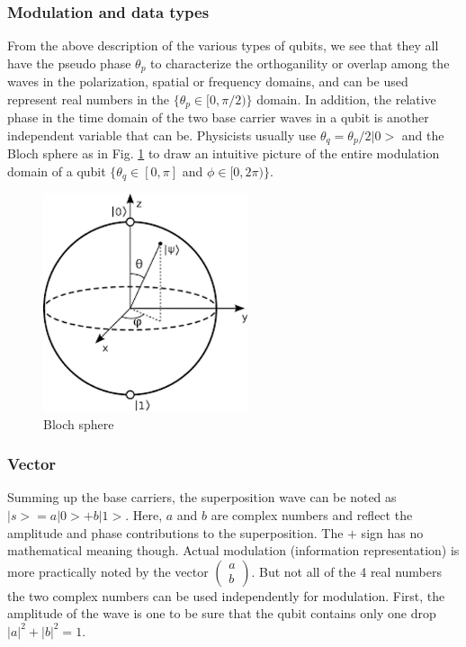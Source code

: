 \documentclass{book}
\begin{document}
\subsubsection{Modulation and data types}
From the above description of the various types of qubits, we see that they all have the pseudo phase $\theta_p$ to characterize the 
orthoganility or overlap among the waves in the polarization, spatial or frequency domains, and can be used represent real numbers in the $\{\theta_p \in [0, \pi/2)\}$ domain. In addition, the relative phase in the time domain of the two base carrier waves in a qubit is another independent variable that can be. Physicists usually use $\theta_q = \theta_p/2 |0>$ and the Bloch sphere as in Fig. \ref{Bloch} to draw an intuitive picture of the entire modulation domain of a qubit $\{\theta_q \in [0, \pi]$ and $\phi \in [0, 2\pi)\}$.

\begin{figure}[ht]
\includegraphics[width=6cm]{pic/blochSphere.png}
\caption{Bloch sphere}
\label{Bloch}
\end{figure}

\subsubsection{Vector}
Summing up the base carriers, the superposition wave can be noted as $|s> = a |0> + b |1>$. Here, $a$ and $b$ are complex numbers and reflect the amplitude and phase contributions to the superposition. The $+$ sign has no mathematical meaning though. Actual modulation (information representation) is more practically noted by the vector $
\begin{pmatrix}
    a \\
    b
\end{pmatrix}.$
But not all of the 4 real numbers the two complex numbers can be used independently for modulation. First, the amplitude of the wave is one to be sure that the qubit contains only one drop $|a|^2 + |b|^2 = 1$. 
 
\end{document}
